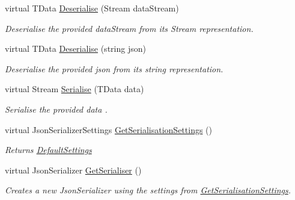 \begin{DoxyCompactItemize}
virtual T\+Data \hyperlink{classCqrs_1_1Azure_1_1BlobStorage_1_1StorageStore_a211bc47bff1108d10e319fee8b9769a0_a211bc47bff1108d10e319fee8b9769a0}{Deserialise} (Stream data\+Stream)
\begin{DoxyCompactList}\small\item\em Deserialise the provided {\itshape data\+Stream}  from its Stream representation. \end{DoxyCompactList}\item 
virtual T\+Data \hyperlink{classCqrs_1_1Azure_1_1BlobStorage_1_1StorageStore_adea25452991418693ed966797581f67f_adea25452991418693ed966797581f67f}{Deserialise} (string json)
\begin{DoxyCompactList}\small\item\em Deserialise the provided {\itshape json}  from its string representation. \end{DoxyCompactList}\item 
virtual Stream \hyperlink{classCqrs_1_1Azure_1_1BlobStorage_1_1StorageStore_a8e5d4e50e054d963f96aaa4808794718_a8e5d4e50e054d963f96aaa4808794718}{Serialise} (T\+Data data)
\begin{DoxyCompactList}\small\item\em Serialise the provided {\itshape data} . \end{DoxyCompactList}\item 
virtual Json\+Serializer\+Settings \hyperlink{classCqrs_1_1Azure_1_1BlobStorage_1_1StorageStore_a9ded88f1b48cf61b3be826fb0997adfb_a9ded88f1b48cf61b3be826fb0997adfb}{Get\+Serialisation\+Settings} ()
\begin{DoxyCompactList}\small\item\em Returns \hyperlink{classCqrs_1_1Azure_1_1BlobStorage_1_1StorageStore_ac5c27123fd0bf4d926a4865e2d6b0bdd_ac5c27123fd0bf4d926a4865e2d6b0bdd}{Default\+Settings} \end{DoxyCompactList}\item 
virtual Json\+Serializer \hyperlink{classCqrs_1_1Azure_1_1BlobStorage_1_1StorageStore_acca953271229a19433db9c38c85b5b9e_acca953271229a19433db9c38c85b5b9e}{Get\+Serialiser} ()
\begin{DoxyCompactList}\small\item\em Creates a new Json\+Serializer using the settings from \hyperlink{classCqrs_1_1Azure_1_1BlobStorage_1_1StorageStore_a9ded88f1b48cf61b3be826fb0997adfb_a9ded88f1b48cf61b3be826fb0997adfb}{Get\+Serialisation\+Settings}. \end{DoxyCompactList}\end{DoxyCompactItemize}
